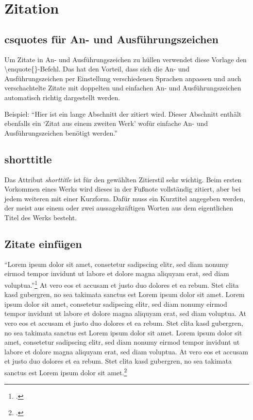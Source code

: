 \section{Zitation}
\subsection{csquotes für An- und Ausführungszeichen}
Um Zitate in An- und Ausführungszeichen zu hüllen verwendet diese Vorlage den \textbackslash enquote\{\}-Befehl. Das hat den Vorteil, dass sich die An- und Ausführungszeichen per Einstellung verschiedenen Sprachen anpassen und auch verschachtelte Zitate mit doppelten und einfachen An- und Ausführungszeichen automatisch richtig dargestellt werden.

Beispiel: \enquote{Hier ist ein lange Abschnitt der zitiert wird. Dieser Abschnitt enthält ebenfalls ein \enquote{Zitat aus einem zweiten Werk} wofür einfache An- und Ausführungszeichen benötigt werden.}

\subsection{shorttitle}
Das Attribut \textit{shorttitle} ist für den gewählten Zitierstil sehr wichtig. Beim ersten Vorkommen eines Werks wird dieses in der Fußnote vollständig zitiert, aber bei jedem weiteren mit einer Kurzform. Dafür muss ein Kurztitel angegeben werden, der meist aus einem oder zwei aussagekräftigen Worten aus dem eigentlichen Titel des Werks besteht.

\subsection{Zitate einfügen}
\enquote{Lorem ipsum dolor sit amet, consetetur sadipscing elitr, sed diam nonumy eirmod tempor invidunt ut labore et dolore magna aliquyam erat, sed diam voluptua.}\footcite[104]{Gnilka.1978} At vero eos et accusam et justo duo dolores et ea rebum. Stet clita kasd gubergren, no sea takimata sanctus est Lorem ipsum dolor sit amet. Lorem ipsum dolor sit amet, consetetur sadipscing elitr, sed diam nonumy eirmod tempor invidunt ut labore et dolore magna aliquyam erat, sed diam voluptua. At vero eos et accusam et justo duo dolores et ea rebum. Stet clita kasd gubergren, no sea takimata sanctus est Lorem ipsum dolor sit amet. Lorem ipsum dolor sit amet, consetetur sadipscing elitr, sed diam nonumy eirmod tempor invidunt ut labore et dolore magna aliquyam erat, sed diam voluptua. At vero eos et accusam et justo duo dolores et ea rebum. Stet clita kasd gubergren, no sea takimata sanctus est Lorem ipsum dolor sit amet.\footcite[Vgl.][104]{Gnilka.1978}

